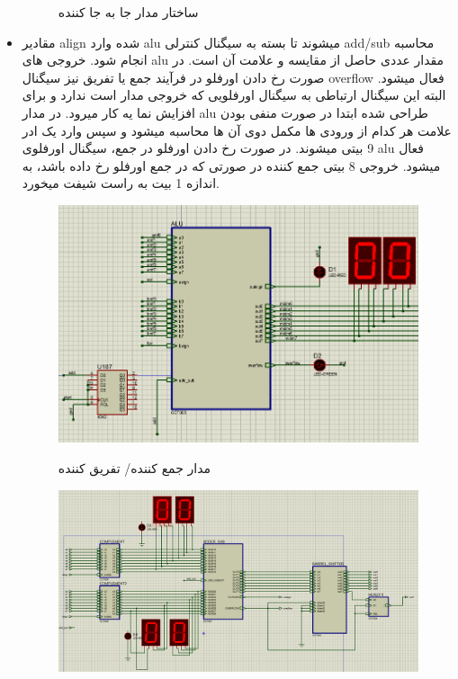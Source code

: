 \documentclass[twoside]{article}
\begin{document}
\begin{itemize}
\begin{figure}[h!]
\begin{center}
				\caption{ساختار مدار جا به جا کننده}
			\end{center}
		\end{figure} 
		\item
		مقادیر align شده وارد alu میشوند تا بسته به سیگنال کنترلی add/sub محاسبه انجام شود. خروجی های alu مقدار عددی حاصل از مقایسه و علامت آن است. در صورت رخ دادن اورفلو در فرآیند جمع یا تفریق نیز سیگنال overflow فعال میشود. البته این سیگنال ارتباطی به سیگنال اورفلویی که خروجی مدار است ندارد و برای افزایش نما یه کار میرود. در مدار alu طراحی شده ابتدا در صورت منفی بودن علامت هر کدام از ورودی ها مکمل دوی آن ها محاسبه میشود و سپس وارد یک ادر 9 بیتی میشوند. در صورت رخ دادن اورفلو در جمع، سیگنال اورفلوی alu فعال میشود. خروجی 8 بیتی جمع کننده در صورتی که در جمع اورفلو رخ داده باشد، به اندازه 1 بیت به راست شیفت میخورد.
		\begin{figure}[h!]
			\begin{center}
				\includegraphics[scale=0.4]{alu}‎
				\caption{مدار جمع کننده/ تفریق کننده}				
			\end{center}
		\end{figure} 
		\begin{figure}[h!]
			\begin{center}
				\includegraphics[scale=0.4]{alu_insider}‎

\end{center}
\end{figure}
\end{itemize}
\end{document}
